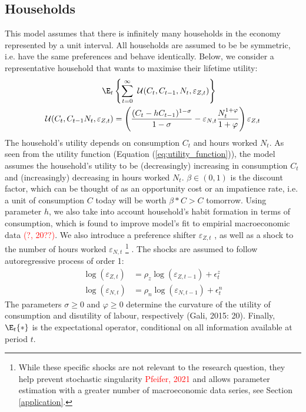 \subsection{Households}
This model assumes that there is infinitely many households in the economy represented by a unit interval. All households are assumed to be be symmetric, i.e. have the same preferences and behave identically. Below, we consider a representative household that wants to maximise their lifetime utility:
\begin{align}
    \E_t &\left\{\sum^{\infty}_{t=0} \ \mathcal{U}(C_t,C_{t-1}, N_t, \varepsilon_{Z,t})\right\} \\
    \mathcal{U}(C_t, C_{t-1} N_t, \varepsilon_{Z,t}) &= \left( \frac{(C_t-hC_{t-1})^{1-\sigma}}{1-\sigma} - \varepsilon_{N,t}\frac{N_t^{1+\varphi}}{1+\varphi} \right)\varepsilon_{Z,t} \label{eq:utility_function}
\end{align}
The household's utility depends on consumption $C_t$ and hours worked $N_t$. As seen from the utility function (Equation (\ref{eq:utility_function})), the model assumes the household's utility to be (decreasingly) increasing in consumption $C_t$ and (increasingly) decreasing in hours worked $N_t$. $\beta \in (0,1)$ is the discount factor, which can be thought of as an opportunity cost or an impatience rate, i.e. a unit of consumption $C$ today will be worth $\beta * C > C$ tomorrow. Using parameter $h$, we also take into account household's habit formation in terms of consumption, which is found to improve model's fit to empirial macroeconomic data \textcolor{red}{(?, 20??)}. We also introduce a preference shifter $\varepsilon_{Z,t}$ \parencite[225]{jordigal_2015_monetary}, as well as a shock to the number of hours worked $\varepsilon_{N,t}$ \footnote{While these specific shocks are not relevant to the research question, they help prevent stochastic singularity \textcolor{red}{Pfeifer, 2021} and allows parameter estimation with a greater number of macroeconomic data series, see Section \ref{application}. } \parencite[]{kolasa_2009_structural}. The shocks are assumed to follow autoregressive process of order 1:
\begin{align}
    \log (\varepsilon_{Z,t}) &= \rho_z \log (\varepsilon_{Z,t-1}) + \epsilon^z_{t} \\
    \log (\varepsilon_{N,t}) &= \rho_n \log (\varepsilon_{N,t-1}) + \epsilon^n_{t}
\end{align}
The parameters $\sigma \geq 0$ and $\varphi \geq 0$ determine the curvature of the utility of consumption and disutility of labour, respectively (Gali, 2015: 20). Finally, $\E_t \{*\}$ is the expectational operator, conditional on all information available at period $t$.
